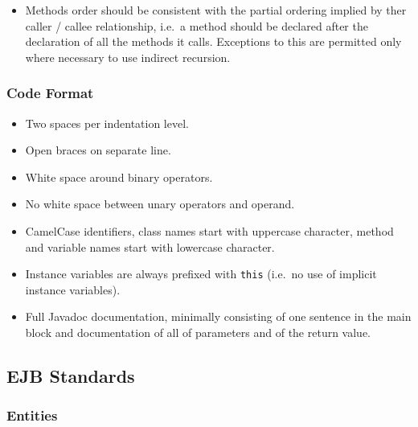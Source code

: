 \documentclass[a4paper,fleqn]{article}
\newcommand{\computercode}[1]{\texttt{#1}}
\begin{document}
\begin{itemize}

\item Methods order should be consistent with the partial ordering
  implied by ther caller / callee relationship, i.e.\ a method should
  be declared after the declaration of all the methods it
  calls. Exceptions to this are permitted only where necessary to use
  indirect recursion.

\end{itemize}


\subsubsection{Code Format}

\begin{itemize}

\item Two spaces per indentation level.

\item Open braces on separate line.

\item White space around binary operators.

\item No white space between unary operators and operand.

\item CamelCase identifiers, class names start with uppercase
  character, method and variable names start with lowercase character.

\item Instance variables are always prefixed with \computercode{this}
  (i.e.\ no use of implicit instance variables).

\item Full Javadoc documentation, minimally consisting of one sentence
  in the main block and documentation of all of parameters and of the
  return value.

\end{itemize}


\subsection{EJB Standards}

\subsubsection{Entities}
\end{document}
